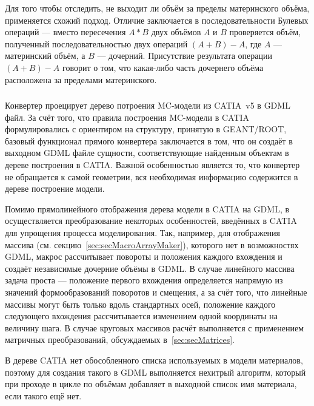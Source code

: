 Для того чтобы отследить, не выходит ли объём за пределы материнского объёма, применяется схожий подход. Отличие заключается в последовательности Булевых операций --- вместо пересечения $A*B$ двух объёмов $A$ и $B$ проверяется объём, полученный последовательностью двух операций $(A+B)-A$, где $A$ --- материнский объём, а $B$ --- дочерний. Присутствие результата операции $(A+B)-A$ говорит о том, что какая-либо часть дочернего объёма расположена за пределами материнского.

\subsubsection{}\label{sec:CATIA2GDML}

Конвертер  проецирует дерево потроения MC-модели из CATIA~v5 в GDML файл. За счёт того, что правила построения MC-модели в CATIA формулировались с ориентиром на структуру, принятую в GEANT/ROOT, базовый функционал прямого конвертера заключается в том, что он создаёт в выходном GDML файле сущности, соответствующие найденным объектам в дереве построения в CATIA. Важной особенностью является то, что конвертер не обращается к самой геометрии, вся необходимая информацию содержится в дереве построение модели.

Помимо прямолинейного отображения дерева модели в CATIA на GDML, в  осуществляется преобразование некоторых особенностей, введённых в CATIA для упрощения процесса моделирования. Так, например, для отображения массива (см. секцию~\ref{sec:secMacroArrayMaker}), которого нет в возможностях GDML, макрос рассчитывает повороты и положения каждого вхождения и создаёт независимые дочерние объёмы в GDML.
В случае линейного массива задача проста --- положение первого вхождения определяется напрямую из значений формообразований поворотов и смещения, а за счёт того, что линейные массивы могут быть только вдоль стандартных осей, положение каждого следующего вхождения рассчитывается изменением одной координаты на величину шага.
В случае круговых массивов расчёт выполняется с применением матричных преобразований, обсуждаемых в~\ref{sec:secMatrices}.

В дереве CATIA нет обособленного списка используемых в модели материалов, поэтому для создания такого в GDML выполняется нехитрый алгоритм, который при проходе в цикле по объёмам добавляет в выходной список имя материала, если такого ещё нет.

